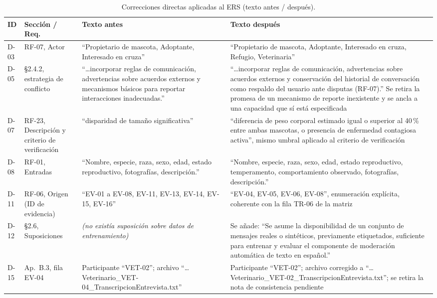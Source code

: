 \documentclass[journal,onecolumn]{IEEEtran}
\begin{document}
	\begin{table}[H]
		\centering
		\caption{Correcciones directas aplicadas al ERS (texto antes / después).}
		\label{tab:correcciones-directas}
		\small
		\begin{tabularx}{\textwidth}{@{}l l X X@{}}
			\toprule
			\textbf{ID} & \textbf{Sección / Req.} & \textbf{Texto antes} & \textbf{Texto después} \\
			\midrule
			D-03 & RF-07, Actor & ``Propietario de mascota, Adoptante, Interesado en cruza'' & ``Propietario de mascota, Adoptante, Interesado en cruza, Refugio, Veterinaria'' \\
			\addlinespace
			D-05 & \S2.4.2, estrategia de conflicto & ``\ldots{}incorporar reglas de comunicación, advertencias sobre acuerdos externos y mecanismos básicos para reportar interacciones inadecuadas.'' & ``\ldots{}incorporar reglas de comunicación, advertencias sobre acuerdos externos y conservación del historial de conversación como respaldo del usuario ante disputas (RF-07).'' Se retira la promesa de un mecanismo de reporte inexistente y se ancla a una capacidad que sí está especificada \\
			\addlinespace
			D-07 & RF-23, Descripción y criterio de verificación & ``disparidad de tamaño significativa'' & ``diferencia de peso corporal estimado igual o superior al 40\,\% entre ambas mascotas, o presencia de enfermedad contagiosa activa'', mismo umbral aplicado al criterio de verificación \\
			\addlinespace
			D-08 & RF-01, Entradas & ``Nombre, especie, raza, sexo, edad, estado reproductivo, fotografías, descripción.'' & ``Nombre, especie, raza, sexo, edad, estado reproductivo, temperamento, comportamiento observado, fotografías, descripción.'' \\
			\addlinespace
			D-11 & RF-06, Origen (ID de evidencia) & ``EV-01 a EV-08, EV-11, EV-13, EV-14, EV-15, EV-16'' & ``EV-04, EV-05, EV-06, EV-08'', enumeración explícita, coherente con la fila TR-06 de la matriz \\
			\addlinespace
			D-12 & \S2.6, Suposiciones & \emph{(no existía suposición sobre datos de entrenamiento)} & Se añade: ``Se asume la disponibilidad de un conjunto de mensajes reales o sintéticos, previamente etiquetados, suficiente para entrenar y evaluar el componente de moderación automática de texto en español.'' \\
			\addlinespace
			D-15 & Ap.\ B.3, fila EV-04 & Participante ``VET-02''; archivo ``\ldots{}Veterinario\_VET-04\_TranscripcionEntrevista.txt'' & Participante ``VET-02''; archivo corregido a ``\ldots{}Veterinario\_VET-02\_TranscripcionEntrevista.txt''; se retira la nota de consistencia pendiente \\

\end{tabularx}
\end{table}
\end{document}
